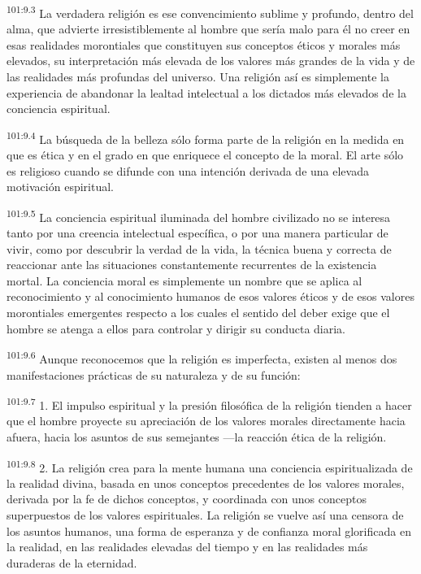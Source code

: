 \documentclass[twoside, 11pt]{book}
\begin{document}
\par
\textsuperscript{101:9.3} La verdadera religión es ese convencimiento sublime y profundo, dentro del alma, que advierte irresistiblemente al hombre que sería malo para él no creer en esas realidades morontiales que constituyen sus conceptos éticos y morales más elevados, su interpretación más elevada de los valores más grandes de la vida y de las realidades más profundas del universo. Una religión así es simplemente la experiencia de abandonar la lealtad intelectual a los dictados más elevados de la conciencia espiritual.

\par
\textsuperscript{101:9.4} La búsqueda de la belleza sólo forma parte de la religión en la medida en que es ética y en el grado en que enriquece el concepto de la moral. El arte sólo es religioso cuando se difunde con una intención derivada de una elevada motivación espiritual.

\par
\textsuperscript{101:9.5} La conciencia espiritual iluminada del hombre civilizado no se interesa tanto por una creencia intelectual específica, o por una manera particular de vivir, como por descubrir la verdad de la vida, la técnica buena y correcta de reaccionar ante las situaciones constantemente recurrentes de la existencia mortal. La conciencia moral es simplemente un nombre que se aplica al reconocimiento y al conocimiento humanos de esos valores éticos y de esos valores morontiales emergentes respecto a los cuales el sentido del deber exige que el hombre se atenga a ellos para controlar y dirigir su conducta diaria.

\par
\textsuperscript{101:9.6} Aunque reconocemos que la religión es imperfecta, existen al menos dos manifestaciones prácticas de su naturaleza y de su función:

\par
\textsuperscript{101:9.7} 1. El impulso espiritual y la presión filosófica de la religión tienden a hacer que el hombre proyecte su apreciación de los valores morales directamente hacia afuera, hacia los asuntos de sus semejantes ---la reacción ética de la religión.

\par
\textsuperscript{101:9.8} 2. La religión crea para la mente humana una conciencia espiritualizada de la realidad divina, basada en unos conceptos precedentes de los valores morales, derivada por la fe de dichos conceptos, y coordinada con unos conceptos superpuestos de los valores espirituales. La religión se vuelve así una censora de los asuntos humanos, una forma de esperanza y de confianza moral glorificada en la realidad, en las realidades elevadas del tiempo y en las realidades más duraderas de la eternidad.
\end{document}
